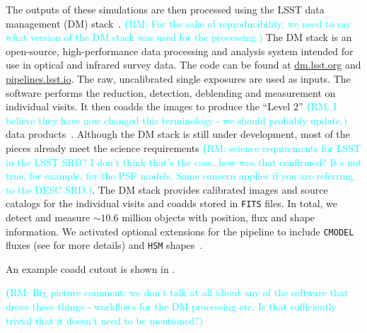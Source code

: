 \documentclass[twocolumn]{aastex62}
\newcommand{\rachel}[1]{{\textcolor{cyan}{{\textbf (RM: #1)}}}}
\begin{document}
The outputs of these simulations are then processed using the LSST data management (DM) stack~\citep{Overview,ScienceBook,WhitePaper,2017arXiv170506766B,2015arXiv151207914J}. \rachel{For the sake of reproducibility, we need to say what version of the DM stack was used for the processing.} The DM stack is an open-source, high-performance data processing and analysis system intended for use in optical and infrared survey data. The code can be found at \url{dm.lsst.org} and \url{pipelines.lsst.io}. The raw, uncalibrated single exposures are used as inputs. The software performs the reduction, detection, deblending and measurement on individual visits. It then coadds the images to produce the ``Level 2'' \rachel{I believe they have now changed this terminology - we should probably update.} data products~\citep{2015arXiv151207914J}. Although the DM stack is still under development, most of the pieces already meet the science requirements \rachel{science requirements for LSST in the LSST SRD?  I don't think that's the case\dots how was that confirmed?  It's not true, for example, for the PSF models.  Same concern applies if you are referring to the DESC SRD.}. The DM stack provides calibrated images and source catalogs for the individual visits and coadds stored in \texttt{FITS} files. In total, we detect and measure $\sim 10.6$ million objects with position, flux and shape information. We activated optional extensions for the pipeline to include \texttt{CMODEL} fluxes (see \cite{2017arXiv170506766B} for more details) and \texttt{HSM} shapes~\citep{2003MNRAS.343..459H,2005MNRAS.361.1287M}.

An example coadd cutout is shown in .

\rachel{Big picture comment: we don't talk at all about any of the software that drove these things - workflows for the DM processing etc.  Is that sufficiently trivial that it doesn't need to be mentioned?}
\end{document}
